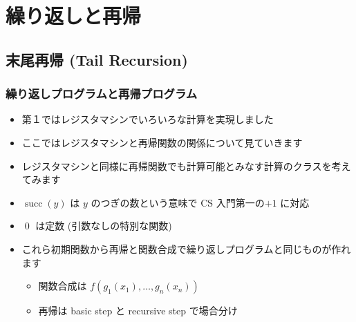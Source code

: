 \section{繰り返しと再帰}
\subsection{末尾再帰 (Tail Recursion)}
\begin{frame}
\frametitle{繰り返しプログラムと再帰プログラム}
  \begin{itemize}
\item 第１ではレジスタマシンでいろいろな計算を実現しました
\item ここではレジスタマシンと再帰関数の関係について見ていきます
\item レジスタマシンと同様に再帰関数でも計算可能とみなす計算のクラスを考えてみます
\item \(\operatorname{succ}(y)\) は $y$ のつぎの数という意味で CS 入門第一の\(+1\) に対応
\item \(\operatorname{0}\) は定数 (引数なしの特別な関数)
\item これら初期関数から再帰と関数合成で繰り返しプログラムと同じものが作れます
    \begin{itemize}
\item 関数合成は \(f(g_1(x_1),\ldots,g_n(x_n))\) 
\item 再帰は basic step と recursive step で場合分け
    \end{itemize}
  \end{itemize}
\end{frame}
